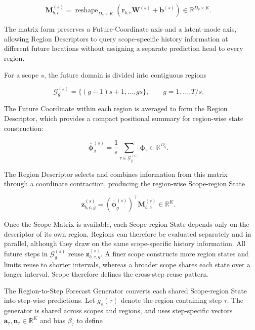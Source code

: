 \documentclass[final,3p,times]{elsarticle}
\begin{document}
\begin{equation}
\mathbf M_{b,c}^{(s)}
=
\operatorname{reshape}_{D_q\times K}
\left(
\mathbf r_{b,c}\mathbf W^{(s)}
+
\mathbf b^{(s)}
\right)
\in\mathbb R^{D_q\times K}.
\end{equation}


The matrix form preserves a Future-Coordinate axis and a latent-mode axis, allowing Region Descriptors to query scope-specific history information at different future locations without assigning a separate prediction head to every region.

For a scope $s$, the future domain is divided into contiguous regions

\begin{equation}
\mathcal G_g^{(s)}
=
\{(g-1)s+1,\ldots,gs\},
\qquad
g=1,\ldots,T/s.
\end{equation}


The Future Coordinate within each region is averaged to form the Region Descriptor, which provides a compact positional summary for region-wise state construction:

\begin{equation}
\overline{\boldsymbol\phi}_g^{(s)}
=
\frac{1}{s}
\sum_{\tau\in\mathcal G_g^{(s)}}
\boldsymbol\phi_\tau
\in\mathbb R^{D_q}.
\end{equation}


The Region Descriptor selects and combines information from this matrix through a coordinate contraction, producing the region-wise Scope-region State

\begin{equation}
\mathbf z_{b,c,g}^{(s)}
=
\left(\overline{\boldsymbol\phi}_g^{(s)}\right)^\top
\mathbf M_{b,c}^{(s)}
\in\mathbb R^K.
\end{equation}


Once the Scope Matrix is available, each Scope-region State depends only on the descriptor of its own region. Regions can therefore be evaluated separately and in parallel, although they draw on the same scope-specific history information. All future steps in $\mathcal G_g^{(s)}$ reuse $\mathbf z_{b,c,g}^{(s)}$. A finer scope constructs more region states and limits reuse to shorter intervals, whereas a broader scope shares each state over a longer interval. Scope therefore defines the cross-step reuse pattern.

The Region-to-Step Forecast Generator converts each shared Scope-region State into step-wise predictions. Let $g_s(\tau)$ denote the region containing step $\tau$. The generator is shared across scopes and regions, and uses step-specific vectors $\mathbf a_\tau,\mathbf n_\tau\in\mathbb R^K$ and bias $\beta_\tau$ to define
\end{document}

